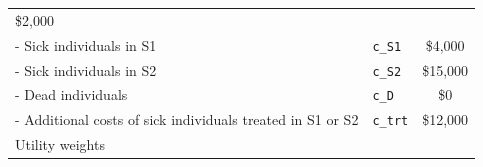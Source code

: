 \documentclass[]{article}
\begin{document}
\begin{longtable}[]{@{}llc@{}}
\begin{minipage}[t]{0.20\columnwidth}
\$2,000\strut
\end{minipage}\tabularnewline
\begin{minipage}[t]{0.47\columnwidth}\raggedright\strut
- Sick individuals in S1\strut
\end{minipage} & \begin{minipage}[t]{0.18\columnwidth}\raggedright\strut
\texttt{c\_S1}\strut
\end{minipage} & \begin{minipage}[t]{0.20\columnwidth}\centering\strut
\$4,000\strut
\end{minipage}\tabularnewline
\begin{minipage}[t]{0.47\columnwidth}\raggedright\strut
- Sick individuals in S2\strut
\end{minipage} & \begin{minipage}[t]{0.18\columnwidth}\raggedright\strut
\texttt{c\_S2}\strut
\end{minipage} & \begin{minipage}[t]{0.20\columnwidth}\centering\strut
\$15,000\strut
\end{minipage}\tabularnewline
\begin{minipage}[t]{0.47\columnwidth}\raggedright\strut
- Dead individuals\strut
\end{minipage} & \begin{minipage}[t]{0.18\columnwidth}\raggedright\strut
\texttt{c\_D}\strut
\end{minipage} & \begin{minipage}[t]{0.20\columnwidth}\centering\strut
\$0\strut
\end{minipage}\tabularnewline
\begin{minipage}[t]{0.47\columnwidth}\raggedright\strut
- Additional costs of sick individuals treated in S1 or S2\strut
\end{minipage} & \begin{minipage}[t]{0.18\columnwidth}\raggedright\strut
\texttt{c\_trt}\strut
\end{minipage} & \begin{minipage}[t]{0.20\columnwidth}\centering\strut
\$12,000\strut
\end{minipage}\tabularnewline
\begin{minipage}[t]{0.47\columnwidth}\raggedright\strut
Utility weights\strut
\end{minipage} & \begin{minipage}[t]{0.18\columnwidth}\raggedright\strut
\strut
\end{minipage} & \begin{minipage}[t]{0.20\columnwidth}\centering\strut

\end{minipage}
\end{longtable}
\end{document}
